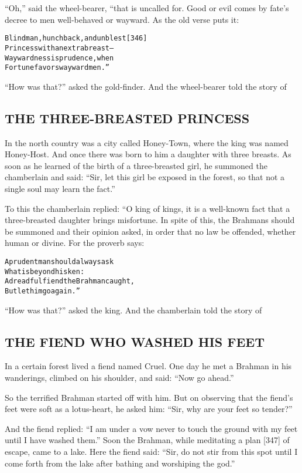 \documentclass{article}
\renewenvironment{verbatim}{\begin{alltt}\normalfont\begin{centering}}{\end{centering}\end{alltt}}
\begin{document}
``Oh,'' said the wheel-bearer, “that is uncalled for. Good or evil
comes by fate's decree to men well-behaved or wayward. As the old
verse puts it:

\begin{verbatim}
Blind man, hunchback, and unblest                       [346]
Princess with an extra breast--
Waywardness is prudence, when
Fortune favors wayward men.”
\end{verbatim}
``How was that?'' asked the gold-finder. And the wheel-bearer told
the story of

\subsection{THE THREE-BREASTED PRINCESS}

In the north country was a city called Honey-Town, where the king
was named Honey-Host. And once there was born to him a daughter
with three breasts. As soon as he learned of the birth of a
three-breasted girl, he summoned the chamberlain and said:
``Sir, let this girl be exposed in the forest, so that not a single soul may learn the fact.''

To this the chamberlain replied: “O king of kings, it is a
well-known fact that a three-breasted daughter brings misfortune.
In spite of this, the Brahmans should be summoned and their opinion
asked, in order that no law be offended, whether human or divine.
For the proverb says:

\begin{verbatim}
A prudent man should always ask
    What is beyond his ken:
A dreadful fiend the Brahman caught,
    But let him go again.”
\end{verbatim}
``How was that?'' asked the king. And the chamberlain told the
story of

\subsection{THE FIEND WHO WASHED HIS FEET}

In a certain forest lived a fiend named Cruel. One day he met a
Brahman in his wanderings, climbed on his shoulder, and said:
``Now go ahead.''

So the terrified Brahman started off with him. But on observing
that the fiend's feet were soft as a lotus-heart, he asked him:
``Sir, why are your feet so tender?''

And the fiend replied:
``I am under a vow never to touch the ground with my feet until I have washed them.''
Soon the Brahman, while meditating a plan [347] of escape, came to
a lake. Here the fiend said:
``Sir, do not stir from this spot until I come forth from the lake after bathing and worshiping the god.''
\end{document}
